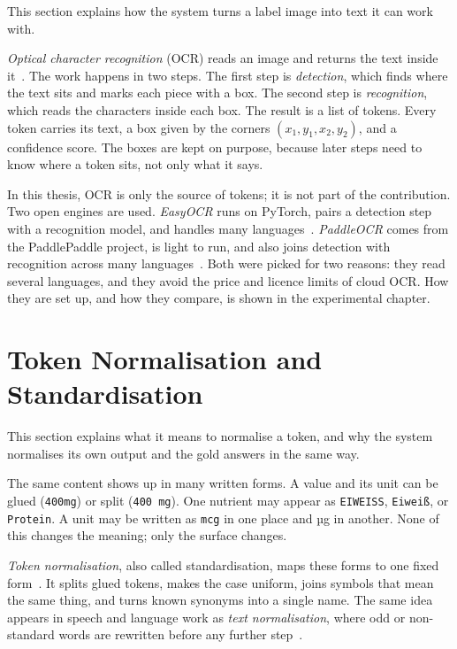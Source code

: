 This section explains how the system turns a label image into text it can work
with.

\emph{Optical character recognition} (OCR) reads an image and returns the text
inside it~\cite{long2021scene}. The work happens in two steps. The first step
is \emph{detection}, which finds where the text sits and marks each piece with a
box. The second step is \emph{recognition}, which reads the characters inside each
box. The result is a list of tokens. Every token carries its text, a box given by
the corners $(x_1, y_1, x_2, y_2)$, and a confidence score. The boxes are kept on
purpose, because later steps need to know where a token sits, not only what it
says.

In this thesis, OCR is only the source of tokens; it is not part of the
contribution. Two open engines are used. \emph{EasyOCR} runs on PyTorch, pairs a
detection step with a recognition model, and handles many
languages~\cite{easyocr}. \emph{PaddleOCR} comes from the PaddlePaddle project, is
light to run, and also joins detection with recognition across many
languages~\cite{cui2025paddleocr}. Both were picked for two reasons: they read
several languages, and they avoid the price and licence limits of cloud OCR. How
they are set up, and how they compare, is shown in the experimental chapter.

\section{Token Normalisation and Standardisation}\label{sec:bgd-normalisation}

This section explains what it means to normalise a token, and why the system
normalises its own output and the gold answers in the same way.

The same content shows up in many written forms. A value and its unit can be
glued (\texttt{400mg}) or split (\texttt{400 mg}). One nutrient may appear as
\texttt{EIWEISS}, \texttt{Eiwei{\ss}}, or \texttt{Protein}. A unit may be written
as \texttt{mcg} in one place and µg in another. None of this changes the meaning;
only the surface changes.

\emph{Token normalisation}, also called standardisation, maps these forms to one
fixed form~\cite{manning2008ir}. It splits glued tokens, makes the case uniform,
joins symbols that mean the same thing, and turns known synonyms into a single
name. The same idea appears in speech and language work as \emph{text
normalisation}, where odd or non-standard words are rewritten before any further
step~\cite{sproat2001normalization}.

